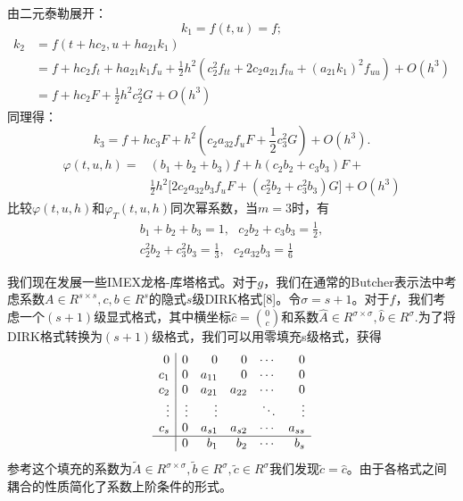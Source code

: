 \documentclass[12pt,a4paper]{article}
\numberwithin{equation}{section}
\begin{document}
由二元泰勒展开：
\begin{equation*}
k_{1}=f(t,u)=f;
\end{equation*}
\begin{align*}
k_{2}&=f(t+hc_{2},u+ha_{21}k_{1})\\
&=f+hc_{2}f_{t}+ha_{21}k_{1}f_{u}+\frac{1}{2}h^2(c_{2}^2f_{tt}+2c_{2}a_{21}f_{tu}+(a_{21}k_{1})^2f_{uu})+O(h^3)\\
&=f+hc_{2}F+\frac{1}{2}h^2c_{2}^2G+O(h^3)
\end{align*}
同理得：
\begin{equation*}
k_{3}=f+hc_{3}F+h^2(c_{2}a_{32}f_{u}F+\frac{1}{2}c_{3}^2G)+O(h^3).
\end{equation*}
\begin{align*}
\varphi(t,u,h)=&(b_{1}+b_{2}+b_{3})f+h(c_{2}b_{2}+c_{3}b_{3})F+\\
&\frac{1}{2}h^2\biggl[2c_{2}a_{32}b_{3}f_{u}F+(c_{2}^2b_{2}+c_{3}^2b_{3})G\biggr]+O(h^3)
\end{align*}
比较$\varphi(t,u,h)$和$\varphi_{T}(t,u,h)$同次幂系数，当$m=3$时，有
\begin{gather*}
b_{1}+b_{2}+b_{3}=1,~~~c_{2}b_{2}+c_{3}b_{3}=\frac{1}{2},\\
c_{2}^2b_{2}+c_{3}^2b_{3}=\frac{1}{3},~~~c_{2}a_{32}b_{3}=\frac{1}{6}
\end{gather*}



我们现在发展一些IMEX龙格-库塔格式。对于$g$，我们在通常的Butcher表示法中考虑系数$A\in R^{s\times s} ,c,b\in R^s$的隐式$s$级DIRK格式[8]。令$\sigma=s+1$。对于$f$，我们考虑一个$(s+1)$级显式格式，其中横坐标$\widehat{c}=\binom{0}{c}$和系数$\widehat{A}\in R^{\sigma\times \sigma},\widehat{b}\in
R^{\sigma}.$为了将DIRK格式转换为$(s+1)$级格式，我们可以用零填充s级格式，获得
\[
\begin{array}{r|r r r r  r}
0 &  0 & 0 & 0  & \cdots & 0 \\
c_{1} & 0 & a_{11} & 0 & \cdots & 0 \\
c_{2} & 0 & a_{21} & a_{22} & \cdots & 0 \\
\vdots & \vdots &  \vdots &  &  \ddots &  \vdots \\
c_{s} & 0 & a_{s1} & a_{s2} & \cdots & a_{ss} \\
\hline
 & 0 & b_{1} & b_{2} & \cdots & b_{s} 
\end{array}
\]
参考这个填充的系数为$\tilde{A}\in R^{\sigma\times\sigma},\tilde{b}\in R^{\sigma},\tilde{c}\in R^{\sigma}$我们发现$\tilde{c}=\widehat{c}$。由于各格式之间耦合的性质简化了系数上阶条件的形式。
\end{document}
